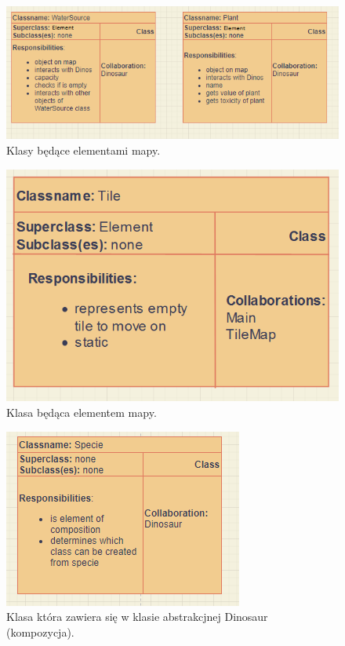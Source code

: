 \begin{figure}[h!]
    \centering
    \includegraphics[scale=0.75]{images/crc/map_elements.png}
    \caption{Klasy będące elementami mapy.}
    \label{fig:my_label}
\end{figure}

\begin{figure}[h!]
    \centering
    \includegraphics[scale=0.75]{images/crc/tiles_crc.png}
    \caption{Klasa będąca elementem mapy.}
    \label{fig:}
\end{figure}

\begin{figure}[h]
    \centering
    \includegraphics[scale=0.75]{images/crc/specie.png}
    \caption{Klasa która zawiera się w klasie abstrakcjnej Dinosaur (kompozycja).}
    \label{fig:specie}
\end{figure}

